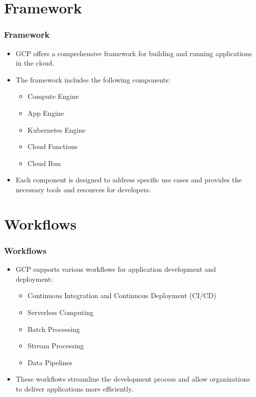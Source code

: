 \section{Framework}

\begin{frame}[fragile]\frametitle{Framework}
  \begin{itemize}
    \item GCP offers a comprehensive framework for building and running applications in the cloud.
    \item The framework includes the following components:
      \begin{itemize}
        \item Compute Engine
        \item App Engine
        \item Kubernetes Engine
        \item Cloud Functions
        \item Cloud Run
      \end{itemize}
    \item Each component is designed to address specific use cases and provides the necessary tools and resources for developers.
  \end{itemize}
\end{frame}

\section{Workflows}

\begin{frame}[fragile]\frametitle{Workflows}
  \begin{itemize}
    \item GCP supports various workflows for application development and deployment:
      \begin{itemize}
        \item Continuous Integration and Continuous Deployment (CI/CD)
        \item Serverless Computing
        \item Batch Processing
        \item Stream Processing
        \item Data Pipelines
      \end{itemize}
    \item These workflows streamline the development process and allow organizations to deliver applications more efficiently.
  \end{itemize}
\end{frame}

